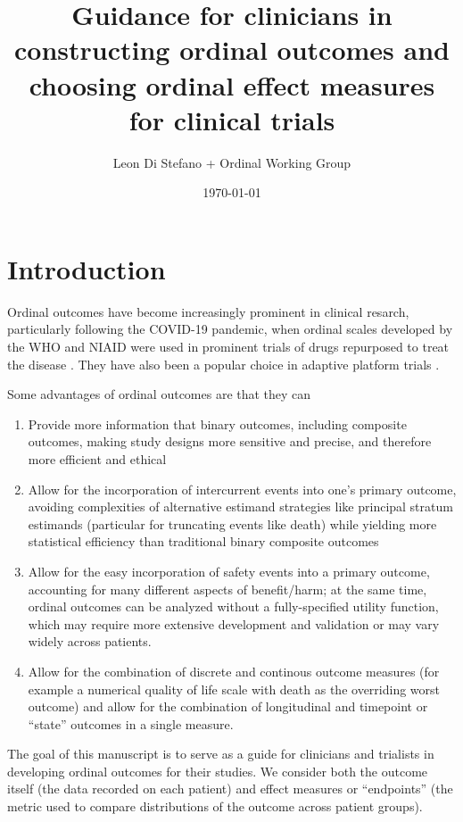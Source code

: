 \documentclass[
  11pt,
  fleqn
]{article}
\title{Guidance for clinicians in constructing ordinal outcomes and choosing
ordinal effect measures for clinical trials}
\author{Leon Di Stefano + Ordinal
Working Group}
\date{\today}
\begin{document}
\maketitle

\tableofcontents
\newpage

\section{Introduction}

Ordinal outcomes have become increasingly prominent in clinical
resarch, particularly following the COVID-19 pandemic, when ordinal
scales developed by the WHO and NIAID were used in prominent trials
of drugs repurposed to treat the disease . They have also
been a popular choice in adaptive platform trials .

Some advantages of ordinal outcomes are that they can
\begin{enumerate}
  \item Provide more information that binary outcomes, including
    composite outcomes, making study designs more sensitive and precise, and
    therefore more efficient and ethical

  \item Allow for the incorporation of intercurrent events into one's primary
    outcome, avoiding complexities of alternative estimand strategies like
    principal stratum estimands (particular for truncating events
    like death) while
    yielding more statistical efficiency than traditional binary
    composite outcomes

  \item Allow for the easy incorporation of safety events into a
    primary outcome, accounting for many different aspects
    of benefit/harm; at the same time, ordinal outcomes can be
    analyzed without a
    fully-specified utility function, which may require more
    extensive development and validation or may vary widely across patients.

  \item Allow for the combination of discrete and continous outcome
    measures (for
      example a numerical quality of life scale with death as the
      overriding worst
    outcome) and allow for the combination of longitudinal and timepoint or
    ``state'' outcomes in a single measure.

\end{enumerate}

The goal of this manuscript is to serve as a guide for clinicians and trialists
in developing ordinal outcomes for their studies. We consider both the outcome
itself (the data recorded on each patient) and effect measures or ``endpoints''
(the metric used to compare distributions of the outcome across patient
groups).
\end{document}
